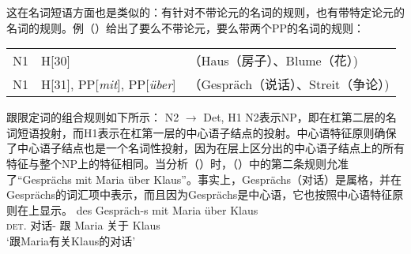 这在名词短语方面也是类似的：有针对不带论元的名词的规则，也有带特定论元的名词的规则。例（）给出了要么不带论元，要么带两个PP的名词的规则\citep*[]{GKPS85a}：
\ea
\begin{tabular}[t]{@{}l@{~$\to$~}ll@{}}
N1 & H[30] &（Haus（房子）、Blume（花）)\\
N1 & H[31], PP[\emph{mit}], PP[\emph{über}] &（Gespräch（说话）、Streit（争论）)\\
\end{tabular}
\z
\nbarc 跟限定词的组合规则如下所示：
\ea
N2 $\to$ Det, H1
\z
N2表示NP，即在杠第二层的名词短语投射，而H1表示在杠第一层的中心语子结点的投射。中心语特征原则确保了中心语子结点也是一个名词性投射，因为在\xbarc 层上区分出的中心语子结点上的所有特征与整个NP上的特征相同。当分析（）时，（）中的第二条规则允准了\nbarc “Gesprächs mit Maria über Klaus”。事实上，Gesprächs（对话）是属格，并在Gesprächs的词汇项中表示，而且因为Gesprächs是中心语，它也按照中心语特征原则在\nbarc 上显示。
\ea
\gll des Gespräch-s mit Maria über Klaus\\
	 \textsc{det}.\gen{} 对话-\gen{} 跟 Maria 关于 Klaus\\
\glt `跟Maria有关Klaus的对话'
